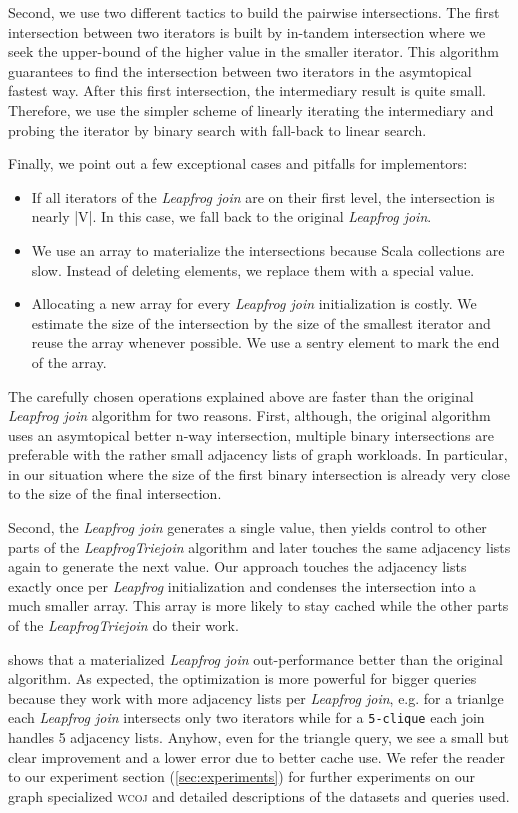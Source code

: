 Second, we use two different tactics to build the pairwise intersections.
The first intersection between two iterators is built by in-tandem intersection where we seek
the upper-bound of the  higher value in the smaller iterator.
This algorithm guarantees to find the intersection between two iterators in the asymtopical fastest
way.
After this first intersection, the intermediary result is quite small.
Therefore, we use the simpler scheme of linearly iterating the intermediary and probing
the iterator by binary search with fall-back to linear search.

Finally, we point out a few exceptional cases and pitfalls for implementors:
\begin{itemize}
  \item If all iterators of the \textit{Leapfrog join} are on their first level, the intersection is nearly |V|. In this case, we fall back
to the original
        \textit{Leapfrog join}.
  \item We use an array to materialize the intersections because Scala collections are slow.
        Instead of deleting elements, we replace them with a special value.
  \item Allocating a new array for every \textit{Leapfrog join} initialization is costly.
        We estimate the size of the intersection by the size of the smallest iterator and
        reuse the array whenever possible. We use a sentry element to mark the end of the array.
\end{itemize}

The carefully chosen operations explained above are faster than the original \textit{Leapfrog join}
algorithm for two reasons.
First, although, the original algorithm uses an asymtopical better n-way intersection, multiple
binary intersections are preferable with the rather small adjacency lists of graph workloads.
In particular, in our situation where the size of the first binary intersection is already
very close to the size of the final intersection.

Second, the \textit{Leapfrog join} generates a single value, then yields control to other parts
of the \textit{LeapfrogTriejoin} algorithm and later touches the same adjacency lists again to generate the next value.
Our approach touches the adjacency lists exactly once per \textit{Leapfrog} initialization and
condenses the intersection into a much smaller array.
This array is more likely to stay cached while the other parts of the \textit{LeapfrogTriejoin} do their work.

 shows that a materialized \textit{Leapfrog join} out-performance better than
the original algorithm.
As expected, the optimization is more powerful for bigger queries because they work with more
adjacency lists per \textit{Leapfrog join}, e.g. for a trianlge each \textit{Leapfrog join} intersects
only two iterators while for a \texttt{5-clique} each join handles 5 adjacency lists.
Anyhow, even for the triangle query, we see a small but clear improvement and a lower error due to
better cache use.
We refer the reader to our experiment section (\ref{sec:experiments}) for further experiments on
our graph specialized \textsc{wcoj} and detailed descriptions of the datasets and queries used.

